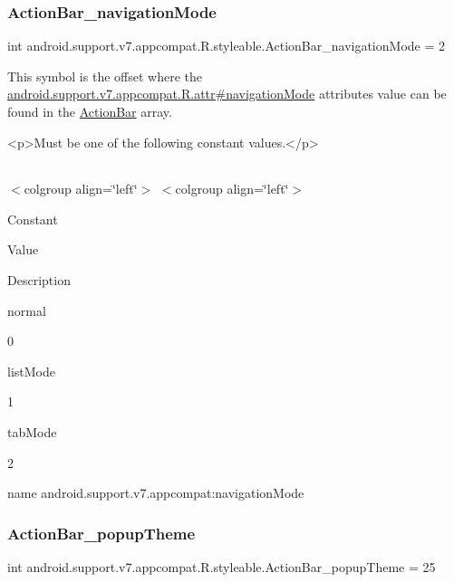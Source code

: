 \subsubsection{\texorpdfstring{Action\+Bar\+\_\+navigation\+Mode}{ActionBar\_navigationMode}}
{\footnotesize\ttfamily int android.\+support.\+v7.\+appcompat.\+R.\+styleable.\+Action\+Bar\+\_\+navigation\+Mode = 2\hspace{0.3cm}{\ttfamily [static]}}

This symbol is the offset where the \hyperlink{classandroid_1_1support_1_1v7_1_1appcompat_1_1R_1_1attr_a15549c3d8819d1bbfe5aab0c51cb2b65}{android.\+support.\+v7.\+appcompat.\+R.\+attr\#navigation\+Mode} attribute\textquotesingle{}s value can be found in the \hyperlink{classandroid_1_1support_1_1v7_1_1appcompat_1_1R_1_1styleable_a5941dc15714398e9ec9afaa0155cc1cf}{Action\+Bar} array.

\begin{DoxyVerb}      <p>Must be one of the following constant values.</p>
\end{DoxyVerb}
 \tabulinesep=1mm
\begin{longtabu} spread 0pt [c]{*{0}{|X[-1]}|}
\hline
\end{longtabu}
$<$colgroup align=\char`\"{}left\char`\"{}$>$ $<$colgroup align=\char`\"{}left\char`\"{}$>$ 

Constant

Value

Description 

{\ttfamily normal}

0

{\ttfamily list\+Mode}

1

{\ttfamily tab\+Mode}

2

name android.\+support.\+v7.\+appcompat\+:navigation\+Mode \mbox{\label{classandroid_1_1support_1_1v7_1_1appcompat_1_1R_1_1styleable_a3757638bea80d4164add30913722be34}} 
\subsubsection{\texorpdfstring{Action\+Bar\+\_\+popup\+Theme}{ActionBar\_popupTheme}}
{\footnotesize\ttfamily int android.\+support.\+v7.\+appcompat.\+R.\+styleable.\+Action\+Bar\+\_\+popup\+Theme = 25\hspace{0.3cm}{\ttfamily [static]}}

